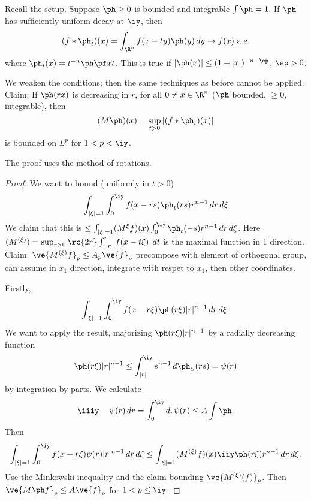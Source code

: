 Recall the setup. Suppose $\ph\ge 0$ is bounded and integrable $\int \ph=1$. If $\ph$ has sufficiently uniform decay at $\iy$, then 
\[
(f*\ph_t)(x)=\int_{\R^n}f(x-ty)\ph(y)\,dy\to f(x)\text{ a.e.}
\]
where $\ph_t(x)=t^{-n}\ph\pf xt$. This is true if $|\ph(x)|\le (1+|x|)^{-n-\ep}$, $\ep>0$.

We weaken the conditions; then the same techniques as before cannot be applied. 
Claim: If $\ph(rx)$ is decreasing in $r$, for all $0\ne x\in \R^n$ ($\ph$ bounded, $\ge 0$, integrable), then 
\[
(M\ph)(x)=\sup_{t>0}|(f*\ph_t)(x)|
\]
is bounded on $L^p$ for $1<p<\iy$. 

The proof uses the method of rotations.
\begin{proof}
We want to bound (uniformly in $t>0$)
\[
\int_{|\xi|=1}\int_0^{\iy} f(x-rs) \ph_t(rs)r^{n-1}\,dr\,d\xi
\]
We claim that this is $\le \int_{|\xi|=1} (M^{\xi}f)(x)\int_0^{\iy} \ph_t(-s) r^{n-1}\,dr\,d\xi$.
Here $(M^{(\xi)})=\sup_{r>0}\rc{2r}\int_{-r}^r |f(x-t\xi)|\,dt$ is the maximal function in 1 direction.
Claim: $\ve{M^{(\xi)}f}_p\le A_p \ve{f}_p$
precompose with element of orthogonal group, can assume in $x_1$ direction, integrate with respet to $x_1$, then other coordinates.

Firstly, 
\[
\int_{|\xi|=1}\int_0^{\iy} f(x-r\xi)\ph(r\xi)|r|^{n-1} \,dr\,d\xi.
\]
We want to apply the result, majorizing $\ph(r\xi)|r|^{n-1}$ by a radially decreasing function
\[
\ph(r\xi) |r|^{n-1}\le \int_{|r|}^{\iy}s^{n-1} \,d\ph_S(rs)=\psi(r)
\]
by integration by parts.
We calculate
\[
\iiiy -\psi(r)\,dr=\int_0^{\iy} d_r\psi(r)\le A\int \ph.
\]
Then 
\[
\int_{|\xi|=1}\int_0^{\iy} f(x-r\xi)\psi(r)|r|^{n-1}\,dr\,d\xi\le \int_{|\xi|=1}(M^{(\xi)}f)(x)\iiy \ph(r\xi)r^{n-1}\,dr\,d\xi.
\]
Use the Minkowski inequality and the claim bounding $\ve{M^{(\xi)}(f)}_p$. Then $\ve{M\ph f}_p\le A\ve{f}_p$ for $1<p\le \iy$.
\end{proof}


